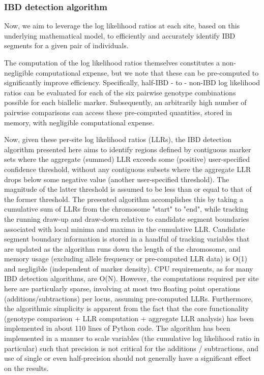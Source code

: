 \documentclass{article}
\begin{document}
\subsubsection{IBD detection algorithm}
Now, we aim to leverage the log likelihood ratios at each site, based on this underlying mathematical model, to efficiently and accurately identify IBD segments for a given pair of individuals. 

The computation of the log likelihood ratios themselves constitutes a non-negligible computational expense, but we note that these can be pre-computed to significantly improve efficiency. Specifically, half-IBD - to - non-IBD log likelihood ratios can be evaluated for each of the six pairwise genotype combinations possible for each biallelic marker. Subsequently, an arbitrarily high number of pairwise comparisons can access these pre-computed quantities, stored in memory, with negligible computational expense.

Now, given these per-site log likelihood ratios (LLRs), the IBD detection algorithm presented here aims to identify regions defined by contiguous marker sets where the aggregate (summed) LLR exceeds some (positive) user-specified confidence threshold, without any contiguous subsets where the aggregate LLR drops below some negative value (another user-specified threshold). The magnitude of the latter threshold is assumed to be less than or equal to that of the former threshold. The presented algorithm accomplishes this by taking a cumulative sum of LLRs from the chromosome "start" to "end", while tracking the running draw-up and draw-down relative to candidate segment boundaries associated with local minima and maxima in the cumulative LLR. Candidate segment boundary information is stored in a handful of tracking variables that are updated as the algorithm runs down the length of the chromosome, and memory usage (excluding allele frequency or pre-computed LLR data) is O(1) and negligible (independent of marker density). CPU requirements, as for many IBD detection algorithms, are O(N). However, the computations required per site here are particularly sparse, involving at most two floating point operations (additions/subtractions) per locus, assuming pre-computed LLRs. Furthermore, the algorithmic simplicity is apparent from the fact that the core functionality (genotype comparison + LLR computation +  aggregate LLR analysis) has been implemented in about 110 lines of Python code. The algorithm has been implemented in a manner to scale variables (the cumulative log likelihood ratio in particular) such that precision is not critical for the additions / subtractions, and use of single or even half-precision should not generally have a significant effect on the results.
\end{document}
